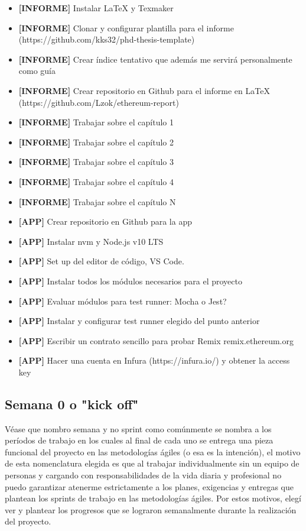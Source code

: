 \begin{itemize}
\item \textbf{[INFORME]} Instalar LaTeX y Texmaker
\item \textbf{[INFORME]} Clonar y configurar plantilla para el informe (https://github.com/kks32/phd-thesis-template)
\item \textbf{[INFORME]} Crear índice tentativo que además me servirá personalmente como guía
\item \textbf{[INFORME]} Crear repositorio en Github para el informe en LaTeX (https://github.com/Lzok/ethereum-report)
\item \textbf{[INFORME]} Trabajar sobre el capítulo 1
\item \textbf{[INFORME]} Trabajar sobre el capítulo 2
\item \textbf{[INFORME]} Trabajar sobre el capítulo 3
\item \textbf{[INFORME]} Trabajar sobre el capítulo 4
\item \textbf{[INFORME]} Trabajar sobre el capítulo N

\item \textbf{[APP]} Crear repositorio en Github para la app
\item \textbf{[APP]} Instalar nvm y Node.js v10 LTS
\item \textbf{[APP]} Set up del editor de código, VS Code.
\item \textbf{[APP]} Instalar todos los módulos necesarios para el proyecto
\item \textbf{[APP]} Evaluar módulos para test runner: Mocha o Jest?
\item \textbf{[APP]} Instalar y configurar test runner elegido del punto anterior
\item \textbf{[APP]} Escribir un contrato sencillo para probar Remix remix.ethereum.org
\item \textbf{[APP]} Hacer una cuenta en Infura (https://infura.io/) y obtener la access key

\end{itemize}

\subsection{Semana 0 o "kick off"}
Véase que nombro semana y no sprint como comúnmente se nombra a los períodos de trabajo en los 
cuales al final de cada uno se entrega una pieza funcional del proyecto en las metodologías ágiles
(o esa es la intención), el motivo de esta nomenclatura elegida es que al trabajar individualmente 
sin un equipo de personas y cargando con responsabilidades de la vida diaria y profesional no puedo
garantizar atenerme estrictamente a los planes, exigencias y entregas que plantean los sprints de 
trabajo en las metodologías ágiles. Por estos motivos, elegí ver y plantear los progresos que se 
lograron semanalmente durante la realización del proyecto.

